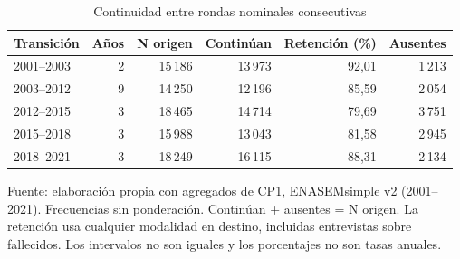 \begin{table}[!htbp]
\centering
\caption{Continuidad entre rondas nominales consecutivas}\label{tab:cp1-transiciones}
\small\setlength{\tabcolsep}{4pt}
\renewcommand{\arraystretch}{1.15}
\begin{tabular}{lrrrrr}
\toprule
\textbf{Transición} & \textbf{Años} & \textbf{N origen} & \textbf{Continúan} & \textbf{Retención (\%)} & \textbf{Ausentes} \\
\midrule
2001--2003 & 2 & 15\,186 & 13\,973 & 92,01 & 1\,213 \\
2003--2012 & 9 & 14\,250 & 12\,196 & 85,59 & 2\,054 \\
2012--2015 & 3 & 18\,465 & 14\,714 & 79,69 & 3\,751 \\
2015--2018 & 3 & 15\,988 & 13\,043 & 81,58 & 2\,945 \\
2018--2021 & 3 & 18\,249 & 16\,115 & 88,31 & 2\,134 \\
\bottomrule
\end{tabular}
\par\medskip
\parbox{\linewidth}{\footnotesize Fuente: elaboración propia con agregados de CP1, ENASEMsimple v2 (2001--2021). Frecuencias sin ponderación. Continúan + ausentes = N origen. La retención usa cualquier modalidad en destino, incluidas entrevistas sobre fallecidos. Los intervalos no son iguales y los porcentajes no son tasas anuales.}
\end{table}
